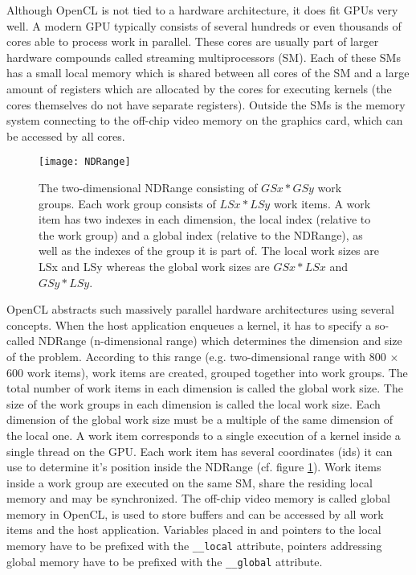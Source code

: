 Although OpenCL is not tied to a hardware architecture, it does fit GPUs very well. A modern GPU typically consists of several hundreds or even thousands of cores able to process work in parallel. These cores are usually part of larger hardware compounds called streaming multiprocessors (SM). Each of these SMs has a small local memory which is shared between all cores of the SM and a large amount of registers which are allocated by the cores for executing kernels (the cores themselves do not have separate registers). Outside the SMs is the memory system connecting to the off-chip video memory on the graphics card, which can be accessed by all cores. 

\begin{figure} 
\centering
\texttt{[image: NDRange]}
\caption{The two-dimensional NDRange consisting of $GSx * GSy$ work groups. Each work group consists of $LSx * LSy$ work items. A work item has two indexes in each dimension, the local index (relative to the work group) and a global index (relative to the NDRange), as well as the indexes of the group it is part of. The local work sizes are LSx and LSy whereas the global work sizes are $GSx * LSx$ and $GSy * LSy$.}
\label{fig:NDRange}
\end{figure}

OpenCL abstracts such massively parallel hardware architectures using several concepts. When the host application enqueues a kernel, it has to specify a so-called NDRange (n-dimensional range) which determines the dimension and size of the problem. According to this range (e.g. two-dimensional range with 800 $\times$ 600 work items), work items are created, grouped together into work groups. The total number of work items in each dimension is called the global work size. The size of the work groups in each dimension is called the local work size. Each dimension of the global work size must be a multiple of the same dimension of the local one. A work item corresponds to a single execution of a kernel inside a single thread on the GPU. Each work item has several coordinates (ids) it can use to determine it's position inside the NDRange (cf. figure \ref{fig:NDRange}). Work items inside a work group are executed on the same SM, share the residing local memory and may be synchronized. The off-chip video memory is called global memory in OpenCL, is used to store buffers and can be accessed by all work items and the host application. Variables placed in and pointers to the local memory have to be prefixed with the \lstinline!__local! attribute, pointers addressing global memory have to be prefixed with the \lstinline!__global! attribute.
